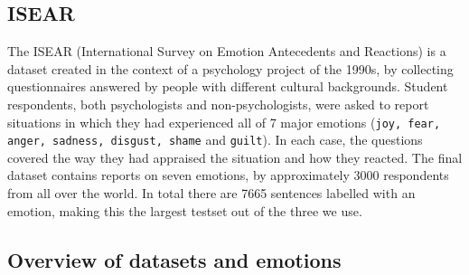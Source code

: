 \documentclass[11pt]{article}
\begin{document}





\subsection{ISEAR}
\label{sec:data:isear}
The ISEAR (International Survey on Emotion Antecedents and Reactions) is a dataset created in the context of a psychology project of the 1990s, by collecting questionnaires answered by people with different cultural backgrounds.   Student respondents, both psychologists and non-psychologists, were asked to report situations in which they had experienced all of 7 major emotions (\texttt{joy, fear, anger, sadness, disgust, shame} and \texttt {guilt}). In each case, the questions covered the way they had appraised the situation and how they reacted. The final dataset contains reports on seven emotions, by approximately 3000 respondents from all over the world.
In total there are 7665 sentences labelled with an emotion, making this the largest testset out of the three we use. 










\subsection{Overview of datasets and emotions}
\label{sec:overview}
\end{document}
